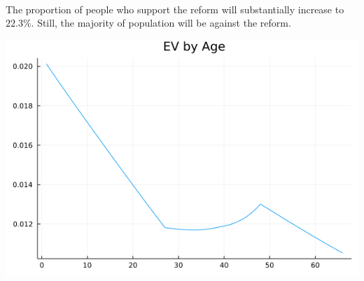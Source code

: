 \documentclass[11pt]{article} %
\begin{document}
\begin{itemize}
	~\\
	The proportion of people who support the reform will substantially increase to $22.3\%$. Still, the majority of population will be against the reform.
		
	\begin{center}
	\includegraphics[width=.5\linewidth]{./julia/EV2.png}
	\end{center}
	
\end{itemize}
	
\end{document}

